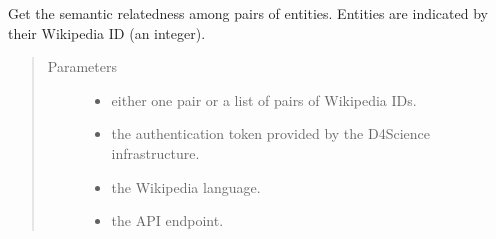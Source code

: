 \documentclass[letterpaper,10pt,english]{sphinxmanual}
\begin{document}
\begin{fulllineitems}
\label{\detokenize{code_comment/tweet_processor:hate_tweet_map.tweets_processor.MyTagMe.relatedness_wid}}
\sphinxAtStartPar
Get the semantic relatedness among pairs of entities. Entities are indicated by their
Wikipedia ID (an integer).
\begin{quote}\begin{description}
\item[{Parameters}] \leavevmode\begin{itemize}
\item {} 
\sphinxAtStartPar
{} \textendash{} either one pair or a list of pairs of Wikipedia IDs.

\item {} 
\sphinxAtStartPar
{} \textendash{} the authentication token provided by the D4Science infrastructure.

\item {} 
\sphinxAtStartPar
{} \textendash{} the Wikipedia language.

\item {} 
\sphinxAtStartPar
{} \textendash{} the API endpoint.

\end{itemize}

\end{description}\end{quote}

\end{fulllineitems}

\end{document}
